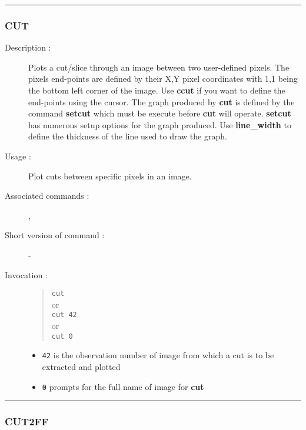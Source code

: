 \hrule
\subsubsection*{\label{CUT}CUT}

\begin{description}

\item[Description :] Plots a cut/slice through an image between two
user-defined pixels.  The pixels end-points are defined by their X,Y
pixel coordinates with 1,1 being the bottom left corner of the image.
Use {\bf ccut} if you want to define the end-points using the cursor.
The graph produced by {\bf cut} is defined by the command {\bf setcut}
which must be execute before {\bf cut} will operate.  {\bf setcut} has
numerous setup options for the graph produced.  Use {\bf line\_width}
to define the thickness of the line used to draw the graph.

\item[Usage :] Plot cuts between specific pixels in an image.
\item[Associated commands :] {\tt {}},
{\tt {}}
\item[Short version of command :] -
\item[Invocation :]

\begin{quote}{\tt  cut }\\
or \\
{\tt cut 42 }\\
or \\
{\tt cut 0 }
\end{quote}

\begin{itemize}
\item {\tt 42} is the observation number of image from which a cut is to
be extracted and plotted
\item {\tt 0} prompts for the full name of image for {\bf cut}
\end{itemize}

\end{description}

\hrule
\subsubsection*{\label{CUT2FF}CUT2FF}

